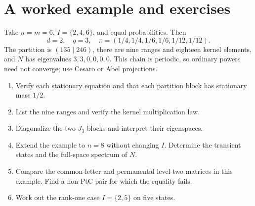 
\section{A worked example and exercises}
Take $n=m=6$, $I=\{2,4,6\}$, and equal probabilities. Then
\[
 d=2,\quad q=3,\quad
 \pi=(1/4,1/4,1/6,1/6,1/12,1/12).
\]
The partition is $(135\mid246)$, there are nine ranges and eighteen
kernel elements, and $N$ has eigenvalues $3,3,0,0,0,0$.
This chain is periodic, so ordinary powers need not converge; use
Cesaro or Abel projections.
\begin{enumerate}
\item Verify each stationary equation and that each partition block has
stationary mass $1/2$.
\item List the nine ranges and verify the kernel multiplication law.
\item Diagonalize the two $J_3$ blocks and interpret their eigenspaces.
\item Extend the example to $n=8$ without changing $I$. Determine the
transient states and the full-space spectrum of $N$.
\item Compare the common-letter and permanental level-two matrices in
this example. Find a non-PtC pair for which the equality fails.
\item Work out the rank-one case $I=\{2,5\}$ on five states.
\end{enumerate}
